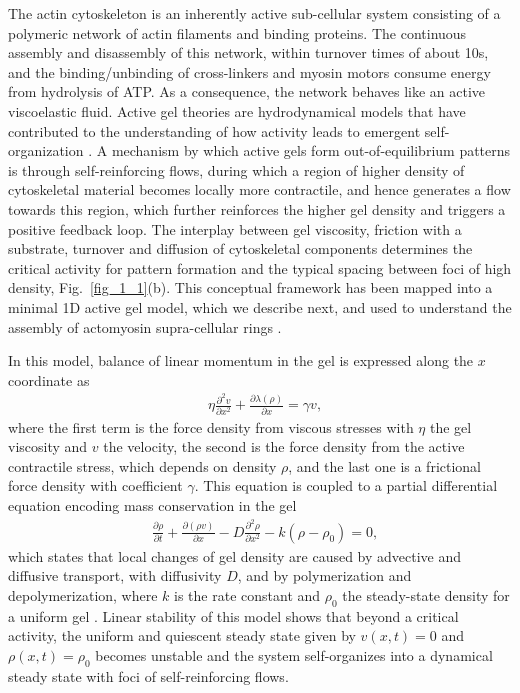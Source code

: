 The actin cytoskeleton is an inherently active  sub-cellular system consisting of a polymeric network of actin filaments and binding proteins. The continuous assembly and disassembly of this network, within turnover times of about 10s, and the binding/unbinding of cross-linkers and myosin motors consume energy from hydrolysis of ATP. As a consequence, the network behaves like an active viscoelastic fluid. Active gel theories are hydrodynamical models that have contributed to the understanding of how activity leads to emergent self-organization \cite{Prost:2015aa}. A mechanism by which active gels form out-of-equilibrium patterns is through self-reinforcing flows, during which a region of higher density of cytoskeletal material becomes locally more contractile, and hence generates a flow towards this region, which further reinforces the higher gel density and triggers a positive feedback loop. The interplay between gel viscosity, friction  with a substrate, turnover and diffusion of cytoskeletal components determines the critical activity for pattern formation and the typical spacing between foci of high density, Fig.~\ref{fig_1_1}(b). This conceptual framework has been mapped into a minimal 1D active gel model, which we describe next, and used to understand the assembly of actomyosin supra-cellular rings \cite{hannezo2015}.



In this model, balance of linear momentum in the gel is expressed along the  $x$  coordinate as
\begin{align}
	& \eta \frac{\partial^2 v}{\partial x^2} +   \frac{\partial \lambda(\rho)}{\partial x}   = \gamma  v,  \label{eq_1}
\end{align}
where the first term is the force density from viscous stresses with $\eta$ the gel viscosity and $v$ the velocity, the second is the force density from  the active contractile stress, which depends on density  $\rho$, and the last one is a frictional force density with coefficient $\gamma$.
This equation is coupled to a partial differential equation encoding mass conservation in the gel
\begin{align}
	& \frac{\partial \rho}{\partial t} + \frac{\partial (\rho v)}{\partial x}  -D \frac{\partial^2 \rho}{\partial x^2} - k(\rho-\rho_0)=0, \label{eq_2}
\end{align}
which states that local changes of gel density are caused by advective and diffusive transport, with diffusivity $D$, and by polymerization and depolymerization, where $k$ is the rate constant and $\rho_0$ the steady-state density for a uniform gel \cite{hannezo2015}. Linear stability of this model shows that beyond a critical activity, the uniform and quiescent steady state given by $v(x,t)=0$ and $\rho(x,t) = \rho_0$ becomes unstable and the system self-organizes into a dynamical steady state with foci of self-reinforcing flows.

